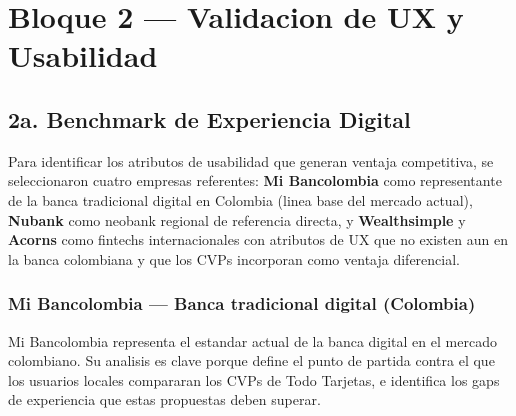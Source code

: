 \documentclass[12pt,a4paper]{article}
\begin{document}

\section{Bloque 2 --- Validacion de UX y Usabilidad}

\subsection{2a. Benchmark de Experiencia Digital}

Para identificar los atributos de usabilidad que generan ventaja competitiva, se
seleccionaron cuatro empresas referentes: \textbf{Mi Bancolombia} como representante
de la banca tradicional digital en Colombia (linea base del mercado actual),
\textbf{Nubank} como neobank regional de referencia directa, y \textbf{Wealthsimple}
y \textbf{Acorns} como fintechs internacionales con atributos de UX que no existen
aun en la banca colombiana y que los CVPs incorporan como ventaja diferencial.

\subsubsection{Mi Bancolombia --- Banca tradicional digital (Colombia)}

Mi Bancolombia representa el estandar actual de la banca digital en el mercado
colombiano. Su analisis es clave porque define el punto de partida contra el que
los usuarios locales compararan los CVPs de Todo Tarjetas, e identifica los gaps
de experiencia que estas propuestas deben superar.
\end{document}
